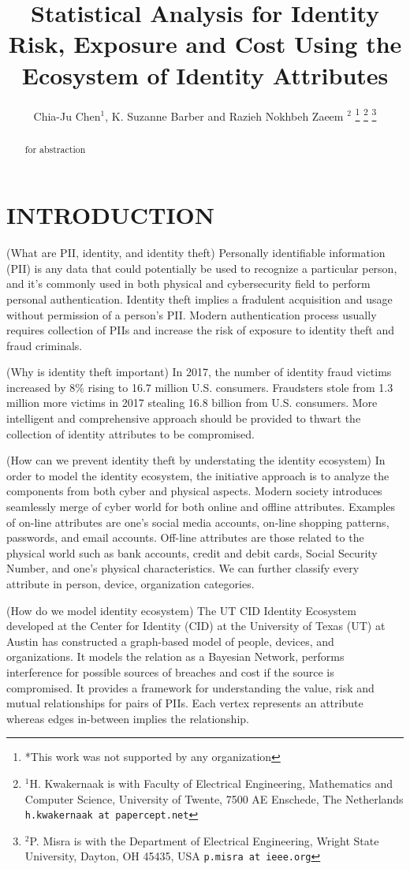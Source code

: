 \documentclass[letterpaper, 10 pt, conference]{ieeeconf}  %
\title{\LARGE \bf
Statistical Analysis for Identity Risk, Exposure
and Cost Using the Ecosystem of Identity Attributes
}
\author{Chia-Ju Chen$^{1}$, K. Suzanne Barber and Razieh Nokhbeh Zaeem $^{2}$%
\thanks{*This work was not supported by any organization}%
\thanks{$^{1}$H. Kwakernaak is with Faculty of Electrical Engineering, Mathematics and Computer Science,
        University of Twente, 7500 AE Enschede, The Netherlands
        {\tt\small h.kwakernaak at papercept.net}}%
\thanks{$^{2}$P. Misra is with the Department of Electrical Engineering, Wright State University,
        Dayton, OH 45435, USA
        {\tt\small p.misra at ieee.org}}%
}
\begin{document}
\maketitle
\thispagestyle{empty}
\pagestyle{empty}


\begin{abstract}

for abstraction

\end{abstract}


\section{INTRODUCTION}

(What are PII, identity, and identity theft)
 Personally identifiable information (PII) is any data that could potentially be used to recognize a particular person, and it's commonly used in both physical and cybersecurity field to perform personal authentication. Identity theft implies a fradulent acquisition and usage without permission of a person's PII. Modern authentication process usually requires collection of PIIs and increase the risk of exposure to identity theft and fraud criminals.

(Why is identity theft important) In 2017, the number of identity fraud victims increased by 8\% rising to 16.7 million U.S. consumers. Fraudsters stole from 1.3 million more victims in 2017 stealing 16.8 billion from U.S. consumers. More intelligent and comprehensive approach should be provided to thwart the collection of identity attributes to be compromised. 

(How can we prevent identity theft by understating the identity ecosystem)
In order to model the identity ecosystem, the initiative approach is to analyze the components from both cyber and physical aspects. Modern society introduces seamlessly merge of cyber world for both online and offline attributes. Examples of on-line attributes are one’s social media accounts, on-line shopping patterns, passwords, and email accounts. Off-line attributes are those related to the physical world such as bank accounts, credit and debit cards, Social Security Number, and one’s physical characteristics. We can further classify every attribute in person, device, organization categories.

(How do we model identity ecosystem)
The UT CID Identity Ecosystem developed at the Center for Identity (CID) at the University of Texas (UT) at Austin has constructed a graph-based model of people, devices,
and organizations. It models the relation as a Bayesian Network, performs interference for possible sources of breaches and cost if the source is compromised.
It provides a framework for understanding the value, risk and mutual relationships for pairs of PIIs. Each vertex represents an attribute whereas edges in-between implies the relationship.
\end{document}
